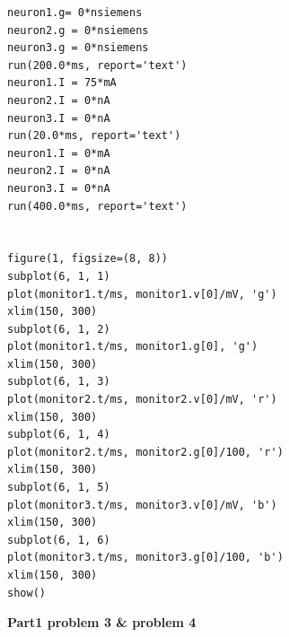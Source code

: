 \documentclass[12pt]{article}
\begin{document}
\begin{lstlisting}
neuron1.g= 0*nsiemens
neuron2.g = 0*nsiemens
neuron3.g = 0*nsiemens
run(200.0*ms, report='text')
neuron1.I = 75*mA
neuron2.I = 0*nA
neuron3.I = 0*nA
run(20.0*ms, report='text')
neuron1.I = 0*mA
neuron2.I = 0*nA
neuron3.I = 0*nA
run(400.0*ms, report='text')


figure(1, figsize=(8, 8))
subplot(6, 1, 1)
plot(monitor1.t/ms, monitor1.v[0]/mV, 'g')
xlim(150, 300)
subplot(6, 1, 2)
plot(monitor1.t/ms, monitor1.g[0], 'g')
xlim(150, 300)
subplot(6, 1, 3)
plot(monitor2.t/ms, monitor2.v[0]/mV, 'r')
xlim(150, 300)
subplot(6, 1, 4)
plot(monitor2.t/ms, monitor2.g[0]/100, 'r')
xlim(150, 300)
subplot(6, 1, 5)
plot(monitor3.t/ms, monitor3.v[0]/mV, 'b')
xlim(150, 300)
subplot(6, 1, 6)
plot(monitor3.t/ms, monitor3.g[0]/100, 'b')
xlim(150, 300)
show()
\end{lstlisting}
\newpage
\normalsize\textbf{Part1 problem 3 \& problem 4}
\\
\end{document}
